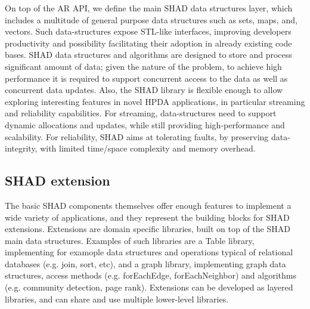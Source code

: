 On top of the A\-R A\-P\-I, we define the main S\-H\-A\-D data structures layer, which includes a multitude of general purpose data structures such as sets, maps, and, vectors. Such data-\/structures expose S\-T\-L-\/like interfaces, improving developers productivity and possibility facilitating their adoption in already existing code bases. S\-H\-A\-D data structures and algorithms are designed to store and process significant amount of data; given the nature of the problem, to achieve high performance it is required to support concurrent access to the data as well as concurrent data updates. Also, the S\-H\-A\-D library is flexible enough to allow exploring interesting features in novel H\-P\-D\-A applications, in particular streaming and reliability capabilities. For streaming, data-\/structures need to support dynamic allocations and updates, while still providing high-\/performance and scalability. For reliability, S\-H\-A\-D aims at tolerating faults, by preserving data-\/integrity, with limited time/space complexity and memory overhead.\hypertarget{index_extension}{}\subsection{S\-H\-A\-D extension}\label{index_extension}
The basic S\-H\-A\-D components themselves offer enough features to implement a wide variety of applications, and they represent the building blocks for S\-H\-A\-D extensions. Extensions are domain specific libraries, built on top of the S\-H\-A\-D main data structures. Examples of such libraries are a Table library, implementing for examople data structures and operations typical of relational databases (e.\-g. join, sort, etc), and a graph library, implementing graph data structures, access methods (e.\-g. for\-Each\-Edge, for\-Each\-Neighbor) and algorithms (e.\-g. community detection, page rank). Extensions can be developed as layered libraries, and can share and use multiple lower-\/level libraries. 